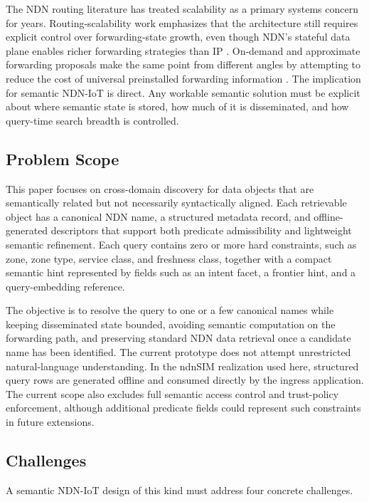 \documentclass[journal]{IEEEtran}
\begin{document}
The NDN routing literature has treated scalability as a primary systems concern for years. Routing-scalability work emphasizes that the architecture still requires explicit control over forwarding-state growth, even though NDN's stateful data plane enables richer forwarding strategies than IP \cite{routing_scalability,scalable_forwarding}. On-demand and approximate forwarding proposals make the same point from different angles by attempting to reduce the cost of universal preinstalled forwarding information \cite{odr,samba}. The implication for semantic NDN-IoT is direct. Any workable semantic solution must be explicit about where semantic state is stored, how much of it is disseminated, and how query-time search breadth is controlled.

\subsection{Problem Scope}

This paper focuses on cross-domain discovery for data objects that are semantically related but not necessarily syntactically aligned. Each retrievable object has a canonical NDN name, a structured metadata record, and offline-generated descriptors that support both predicate admissibility and lightweight semantic refinement. Each query contains zero or more hard constraints, such as zone, zone type, service class, and freshness class, together with a compact semantic hint represented by fields such as an intent facet, a frontier hint, and a query-embedding reference.

The objective is to resolve the query to one or a few canonical names while keeping disseminated state bounded, avoiding semantic computation on the forwarding path, and preserving standard NDN data retrieval once a candidate name has been identified. The current prototype does not attempt unrestricted natural-language understanding. In the ndnSIM realization used here, structured query rows are generated offline and consumed directly by the ingress application. The current scope also excludes full semantic access control and trust-policy enforcement, although additional predicate fields could represent such constraints in future extensions.

\subsection{Challenges}

A semantic NDN-IoT design of this kind must address four concrete challenges.
\end{document}
